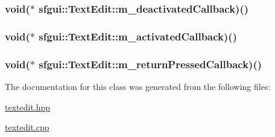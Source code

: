 \hypertarget{classsfgui_1_1TextEdit_bfa97d7c95f54cc91600375242fe1ea6}{
\subsubsection[m\_\-deactivatedCallback]{\setlength{\rightskip}{0pt plus 5cm}void($\ast$ {\bf sfgui::TextEdit::m\_\-deactivatedCallback})()}}
\label{classsfgui_1_1TextEdit_bfa97d7c95f54cc91600375242fe1ea6}


\hypertarget{classsfgui_1_1TextEdit_9cf910f9fca635f595d6a8963d7e30d1}{
\subsubsection[m\_\-activatedCallback]{\setlength{\rightskip}{0pt plus 5cm}void($\ast$ {\bf sfgui::TextEdit::m\_\-activatedCallback})()}}
\label{classsfgui_1_1TextEdit_9cf910f9fca635f595d6a8963d7e30d1}


\hypertarget{classsfgui_1_1TextEdit_d86f9eaadf1313214631b2de009abf55}{
\subsubsection[m\_\-returnPressedCallback]{\setlength{\rightskip}{0pt plus 5cm}void($\ast$ {\bf sfgui::TextEdit::m\_\-returnPressedCallback})()}}
\label{classsfgui_1_1TextEdit_d86f9eaadf1313214631b2de009abf55}




The documentation for this class was generated from the following files:\begin{CompactItemize}
\item 
\hyperlink{textedit_8hpp}{textedit.hpp}\item 
\hyperlink{textedit_8cpp}{textedit.cpp}\end{CompactItemize}

